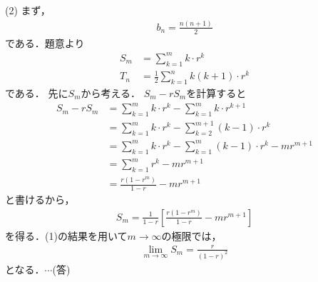 \documentclass[a4paper,10pt]{ltjsarticle}
\begin{document}
\begin{multicols}{2}
  \vspace{10pt}
  (2)
  まず，
  \begin{align*}
    b_n = \frac{n(n+1)}{2}
  \end{align*}
  である．題意より
  \begin{align*}
    S_m & = \sum_{k=1}^m k \cdot r^k                 \\
    T_n & = \frac{1}{2}\sum_{k=1}^n k(k+1) \cdot r^k
  \end{align*}
  である．
  先に$S_m$から考える．
  $S_m - rS_m$を計算すると
  \begin{align*}
    S_m - rS_m
     & =  \sum_{k=1}^m k \cdot r^k -  \sum_{k=1}^m k \cdot r^{k+1}               \\
     & =  \sum_{k=1}^m k \cdot r^k -  \sum_{k=2}^{m+1} (k-1) \cdot r^{k}         \\
     & =  \sum_{k=1}^m k \cdot r^k -  \sum_{k=1}^{m} (k-1) \cdot r^{k} -mr^{m+1} \\
     & =  \sum_{k=1}^m r^k -mr^{m+1}                                             \\
     & =  \frac{r(1-r^m)}{1-r} -mr^{m+1}
  \end{align*}
  と書けるから，
  \begin{align*}
    S_m  = \frac{1}{1-r}\left[\frac{r(1-r^m)}{1-r} -mr^{m+1}\right]
  \end{align*}
  を得る．(1)の結果を用いて$m\to\infty$の極限では，
  \begin{align}
    \lim_{m\to\infty}S_m = \frac{r}{(1-r)^2}\label{eq:2}
  \end{align}
  となる．$\cdots$(答)


\end{multicols}
\end{document}
